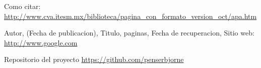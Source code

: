 \documentclass[a4paper,11pt]{article}                 %
\begin{document}
  
  \begin{appendix}                                    %
    \listoffigures                                    %
    \listoftables                                     %
  \end{appendix}
  
  \begin{thebibliography}{}                           %
      Como citar: \url{http://www.cva.itesm.mx/biblioteca/pagina_con_formato_version_oct/apa.htm} %

      Autor,
      (Fecha de publicacion),
      Titulo, paginas,
      Fecha de recuperacion,
      Sitio web: \url{http://www.google.com}

      Repositorio del proyecto \url{https://github.com/penserbjorne}
  \end{thebibliography}

\end{document}
